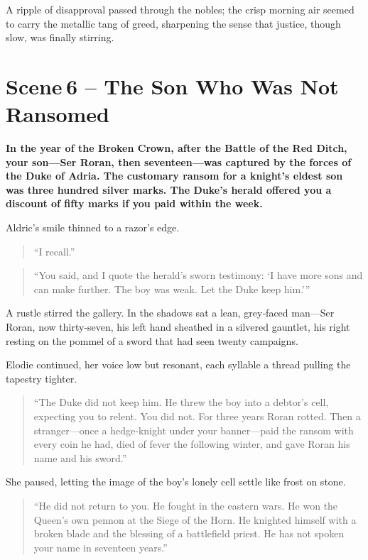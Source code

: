 \documentclass[11pt]{book}
\begin{document}
A ripple of disapproval passed through the nobles; the crisp morning air seemed to carry the metallic tang of greed, sharpening the sense that justice, though slow, was finally stirring.

\section*{Scene 6 – The Son Who Was Not Ransomed}
\smallskip
\textbf{In the year of the Broken Crown, after the Battle of the Red Ditch, your son—Ser Roran, then seventeen—was captured by the forces of the Duke of Adria. The customary ransom for a knight’s eldest son was three hundred silver marks. The Duke’s herald offered you a discount of fifty marks if you paid within the week.}

Aldric’s smile thinned to a razor’s edge.

\begin{quote}
``I recall.''
\end{quote}

\begin{quote}
``You said, and I quote the herald’s sworn testimony: ‘I have more sons and can make further. The boy was weak. Let the Duke keep him.’''
\end{quote}

A rustle stirred the gallery. In the shadows sat a lean, grey‑faced man—Ser Roran, now thirty‑seven, his left hand sheathed in a silvered gauntlet, his right resting on the pommel of a sword that had seen twenty campaigns.

Elodie continued, her voice low but resonant, each syllable a thread pulling the tapestry tighter.

\begin{quote}
``The Duke did not keep him. He threw the boy into a debtor’s cell, expecting you to relent. You did not. For three years Roran rotted. Then a stranger—once a hedge‑knight under your banner—paid the ransom with every coin he had, died of fever the following winter, and gave Roran his name and his sword.''
\end{quote}

She paused, letting the image of the boy’s lonely cell settle like frost on stone.

\begin{quote}
``He did not return to you. He fought in the eastern wars. He won the Queen’s own pennon at the Siege of the Horn. He knighted himself with a broken blade and the blessing of a battlefield priest. He has not spoken your name in seventeen years.''
\end{quote}
\end{document}
